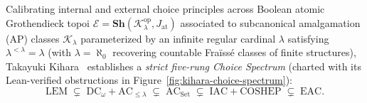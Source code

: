 \documentclass[10pt,twoside,openright]{book}
\theoremstyle{crmplain}
\theoremstyle{crmdef}
\theoremstyle{crmremark}
\begin{document}
Calibrating internal and external choice principles across Boolean atomic Grothendieck topoi $\mathcal{E} = \mathbf{Sh}(\mathcal{K}_\lambda^{\mathrm{op}}, J_{\mathrm{at}})$ associated to subcanonical amalgamation ($\mathrm{AP}$) classes $\mathcal{K}_\lambda$ parameterized by an infinite regular cardinal $\lambda$ satisfying $\lambda^{<\lambda} = \lambda$ (with $\lambda = \aleph_0$ recovering countable Fra\"iss\'e classes of finite structures), Takayuki Kihara~\cite[Sections~3, 5--8, and Table~1]{Kihara26} establishes a \emph{strict five-rung Choice Spectrum} (charted with its Lean-verified obstructions in Figure~\ref{fig:kihara-choice-spectrum}):
\[
  \mathrm{LEM} \;\subsetneq\; \mathrm{DC}_\omega + \mathrm{AC}_{\le \lambda} \;\subsetneq\; \mathrm{AC}_{\mathrm{Set}} \;\subsetneq\; \mathrm{IAC} + \mathrm{COSHEP} \;\subsetneq\; \mathrm{EAC}.
\]
\end{document}
